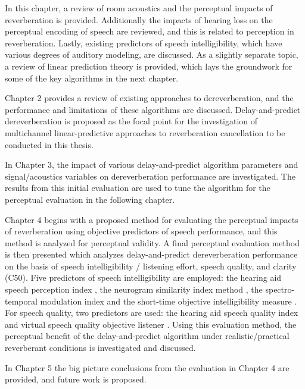 In this chapter, a review of room acoustics and the perceptual impacts of reverberation is provided. Additionally the impacts of hearing loss on the perceptual encoding of speech are reviewed, and this is related to perception in reverberation. Lastly, existing predictors of speech intelligibility, which have various degrees of auditory modeling, are discussed. As a slightly separate topic, a review of linear prediction theory is provided, which lays the groundwork for some of the key algorithms in the next chapter.

Chapter 2 provides a review of existing approaches to dereverberation, and the performance and limitations of these algorithms are discussed. Delay-and-predict dereverberation \citep{triki2006delay} is proposed as the focal point for the investigation of multichannel linear-predictive approaches to reverberation cancellation to be conducted in this thesis.

In Chapter 3, the impact of various delay-and-predict algorithm parameters and signal/acoustics variables on dereverberation performance are investigated. The results from this initial evaluation are used to tune the algorithm for the perceptual evaluation in the following chapter.

Chapter 4 begins with a proposed method for evaluating the perceptual impacts of reverberation using objective predictors of speech performance, and this method is analyzed for perceptual validity. A final perceptual evaluation method is then presented which analyzes delay-and-predict dereverberation performance on the basis of speech intelligibility / listening effort, speech quality, and clarity (C50). Five predictors of speech intelligibility are employed: the hearing aid speech perception index \citep[HASPI, ][]{kates2022overview}, the neurogram similarity index method \citep[NSIM, ][]{hines2012speech}, the spectro-temporal modulation index \citep[STMI, ][]{zilany2007predictions} and the short-time objective intelligibility measure \citep[STOI, ][]{taal2010short}. For speech quality, two predictors are used: the hearing aid speech quality index \citep[HASPI, ][]{kates2022overview} and virtual speech quality objective listener \citep[VISQOL, ][]{hines2015visqol}. Using this evaluation method, the perceptual benefit of the delay-and-predict algorithm under realistic/practical reverberant conditions is investigated and discussed.

In Chapter 5 the big picture conclusions from the evaluation in Chapter 4 are provided, and future work is proposed.

